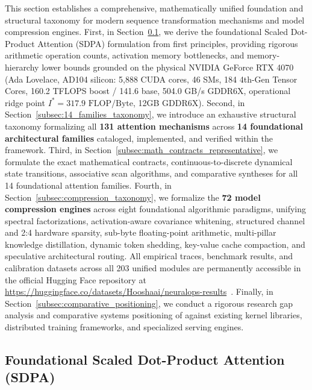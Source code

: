 This section establishes a comprehensive, mathematically unified foundation and structural taxonomy for modern sequence transformation mechanisms and model compression engines. First, in Section~\ref{subsec:attention_landscape}, we derive the foundational Scaled Dot-Product Attention (SDPA) formulation from first principles, providing rigorous arithmetic operation counts, activation memory bottlenecks, and memory-hierarchy lower bounds grounded on the physical NVIDIA GeForce RTX 4070 (Ada Lovelace, AD104 silicon: 5,888 CUDA cores, 46 SMs, 184 4th-Gen Tensor Cores, 160.2 TFLOPS boost / 141.6 base, 504.0 GB/s GDDR6X, operational ridge point $I^* = 317.9\text{ FLOP/Byte}$, 12GB GDDR6X). Second, in Section~\ref{subsec:14_families_taxonomy}, we introduce an exhaustive structural taxonomy formalizing all \textbf{131 attention mechanisms} across \textbf{14 foundational architectural families} cataloged, implemented, and verified within the \neuralops{} framework. Third, in Section~\ref{subsec:math_contracts_representative}, we formulate the exact mathematical contracts, continuous-to-discrete dynamical state transitions, associative scan algorithms, and comparative syntheses for all 14 foundational attention families. Fourth, in Section~\ref{subsec:compression_taxonomy}, we formalize the \textbf{72 model compression engines} across eight foundational algorithmic paradigms, unifying spectral factorizations, activation-aware covariance whitening, structured channel and 2:4 hardware sparsity, sub-byte floating-point arithmetic, multi-pillar knowledge distillation, dynamic token shedding, key-value cache compaction, and speculative architectural routing. All empirical traces, benchmark results, and calibration datasets across all 203 unified modules are permanently accessible in the official Hugging Face repository at \url{https://huggingface.co/datasets/Hooshaai/neuralops-results}~\cite{neuralops_results_hf}. Finally, in Section~\ref{subsec:comparative_positioning}, we conduct a rigorous research gap analysis and comparative systems positioning of \neuralops{} against existing kernel libraries, distributed training frameworks, and specialized serving engines.

\subsection{Foundational Scaled Dot-Product Attention (SDPA)}
\label{subsec:attention_landscape}

